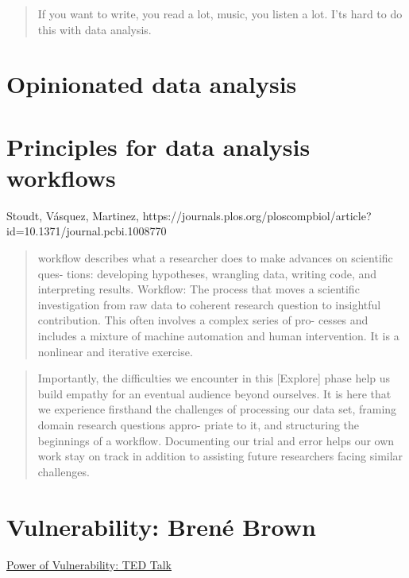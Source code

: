 \documentclass[
  letterpaper,
  DIV=11,
  numbers=noendperiod]{scrreprt}
\begin{document}
\begin{quote}
If you want to write, you read a lot, music, you listen a lot. I'ts hard
to do this with data analysis.
\end{quote}

\hypertarget{opinionated-data-analysis}{%
\section{Opinionated data analysis}\label{opinionated-data-analysis}}

\hypertarget{principles-for-data-analysis-workflows}{%
\section{Principles for data analysis
workflows}\label{principles-for-data-analysis-workflows}}

Stoudt, Vásquez, Martinez,
https://journals.plos.org/ploscompbiol/article?id=10.1371/journal.pcbi.1008770

\begin{quote}
workflow describes what a researcher does to make advances on scientific
ques- tions: developing hypotheses, wrangling data, writing code, and
interpreting results. Workflow: The process that moves a scientific
investigation from raw data to coherent research question to insightful
contribution. This often involves a complex series of pro- cesses and
includes a mixture of machine automation and human intervention. It is a
nonlinear and iterative exercise.
\end{quote}

\begin{quote}
Importantly, the difficulties we encounter in this {[}Explore{]} phase
help us build empathy for an eventual audience beyond ourselves. It is
here that we experience firsthand the challenges of processing our data
set, framing domain research questions appro- priate to it, and
structuring the beginnings of a workflow. Documenting our trial and
error helps our own work stay on track in addition to assisting future
researchers facing similar challenges.
\end{quote}

\hypertarget{vulnerability-brenuxe9-brown}{%
\section{Vulnerability: Brené
Brown}\label{vulnerability-brenuxe9-brown}}

\href{https://www.ted.com/talks/brene_brown_the_power_of_vulnerability?language=en}{Power
of Vulnerability: TED Talk}
\end{document}

